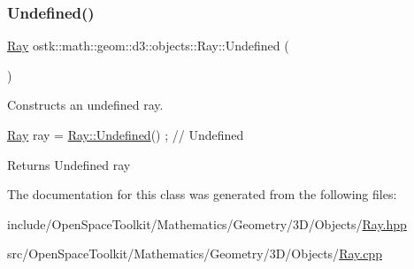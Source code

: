 \subsubsection{\texorpdfstring{Undefined()}{Undefined()}}
{\footnotesize\ttfamily \hyperlink{classostk_1_1math_1_1geom_1_1d3_1_1objects_1_1_ray}{Ray} ostk\+::math\+::geom\+::d3\+::objects\+::\+Ray\+::\+Undefined (\begin{DoxyParamCaption}{ }\end{DoxyParamCaption})\hspace{0.3cm}{\ttfamily [static]}}



Constructs an undefined ray. 


\begin{DoxyCode}
\hyperlink{classostk_1_1math_1_1geom_1_1d3_1_1objects_1_1_ray_a78335698f8a4f72e613e607b13121df0}{Ray} ray = \hyperlink{classostk_1_1math_1_1geom_1_1d3_1_1objects_1_1_ray_a858510b6478f7cb47b763df6c641dfa7}{Ray::Undefined}() ; \textcolor{comment}{// Undefined}
\end{DoxyCode}


\begin{DoxyReturn}{Returns}
Undefined ray 
\end{DoxyReturn}


The documentation for this class was generated from the following files\+:\begin{DoxyCompactItemize}
\item 
include/\+Open\+Space\+Toolkit/\+Mathematics/\+Geometry/3\+D/\+Objects/\hyperlink{_ray_8hpp}{Ray.\+hpp}\item 
src/\+Open\+Space\+Toolkit/\+Mathematics/\+Geometry/3\+D/\+Objects/\hyperlink{_ray_8cpp}{Ray.\+cpp}\end{DoxyCompactItemize}
